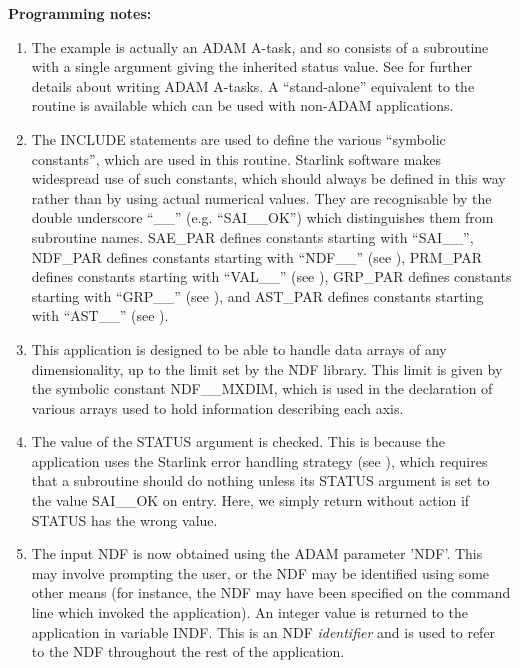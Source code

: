 {\bf Programming notes:}

\begin{enumerate}

\item The example is actually an ADAM A-task, and so consists of a subroutine
with a single argument giving the inherited status value. See
 for
further details about writing ADAM A-tasks. A ``stand-alone'' equivalent to the
 routine is available which can be used with non-ADAM applications. 

\item The INCLUDE statements are used to define the various ``symbolic
constants'', which are used in this routine. Starlink software makes widespread
use of such constants, which should always be defined in this way rather than by
using actual numerical values. They are recognisable by the double underscore
``\_\_'' (e.g. ``SAI\_\_OK'') which distinguishes them from subroutine names.
SAE\_PAR defines constants starting with ``SAI\_\_'', NDF\_PAR defines constants
starting with ``NDF\_\_'' (see ), PRM\_PAR defines constants starting with
``VAL\_\_'' (see ), GRP\_PAR defines constants starting with
``GRP\_\_'' (see ), and AST\_PAR defines constants 
starting with ``AST\_\_'' (see ). 

\item This application is designed to be able to handle data arrays of any
dimensionality, up to the limit set by the NDF library. This limit is given by
the symbolic constant NDF\_\_MXDIM, which is used in the declaration of various
arrays used to hold information describing each axis. 

\item The value of the STATUS argument is checked. This is because the
application uses the Starlink error handling strategy (see
), which
requires that a subroutine should do nothing unless its STATUS argument is set
to the value SAI\_\_OK on entry. Here, we simply return without action if STATUS
has the wrong value. 

\item The input NDF is now obtained using the ADAM parameter 'NDF'. This may
involve prompting the user, or the NDF may be identified using some other means
(for instance, the NDF may have been specified on the command line which
invoked the application). An integer value is returned to the application in 
variable INDF. This is an NDF {\em identifier} and is used to refer to the NDF 
throughout the rest of the application.


\end{enumerate}
